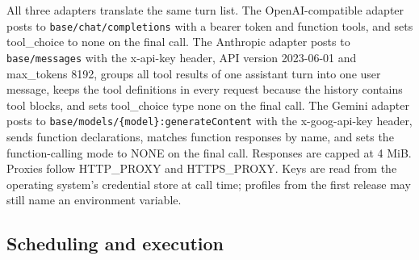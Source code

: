 \documentclass[11pt,a4paper]{article}
\begin{document}
All three adapters translate the same turn list. The OpenAI-compatible
adapter posts to \texttt{base/chat/completions} with a bearer token and
function tools, and sets tool\_choice to none on the final call. The
Anthropic adapter posts to \texttt{base/messages} with the x-api-key
header, API version 2023-06-01 and max\_tokens 8192, groups all tool
results of one assistant turn into one user message, keeps the tool
definitions in every request because the history contains tool blocks,
and sets tool\_choice type none on the final call. The Gemini adapter
posts to \texttt{base/models/\{model\}:generateContent} with the
x-goog-api-key header, sends function declarations, matches function
responses by name, and sets the function-calling mode to NONE on the
final call. Responses are capped at 4 MiB. Proxies follow HTTP\_PROXY
and HTTPS\_PROXY. Keys are read from the operating system's credential
store at call time; profiles from the first release may still name an
environment variable.

\subsection{Scheduling and execution}\label{scheduling-and-execution}
\end{document}
